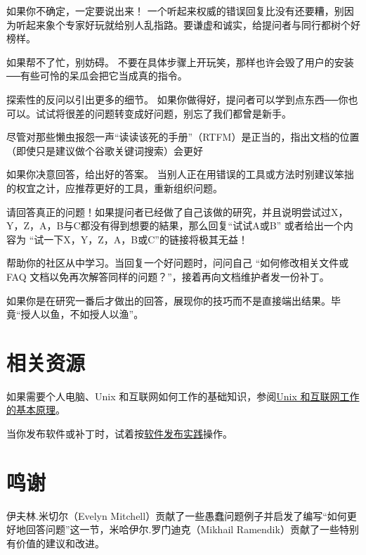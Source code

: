 如果你不确定，一定要说出来！ 一个听起来权威的错误回复比没有还要糟，别因为听起来象个专家好玩就给别人乱指路。要谦虚和诚实，给提问者与同行都树个好榜样。

如果帮不了忙，别妨碍。 不要在具体步骤上开玩笑，那样也许会毁了用户的安装──有些可怜的呆瓜会把它当成真的指令。

探索性的反问以引出更多的细节。 如果你做得好，提问者可以学到点东西──你也可以。试试将很差的问题转变成好问题，别忘了我们都曾是新手。

尽管对那些懒虫报怨一声“读读该死的手册”（RTFM）是正当的，指出文档的位置（即使只是建议做个谷歌关键词搜索）会更好

如果你决意回答，给出好的答案。 当别人正在用错误的工具或方法时别建议笨拙的权宜之计，应推荐更好的工具，重新组织问题。

请回答真正的问题！如果提问者已经做了自己该做的研究，并且说明尝试过X，Y，Z，A，B与C都没有得到想要的結果，那么回复“试试A或B” 或者给出一个内容为 “试一下X，Y，Z，A，B或C”的链接将极其无益！

帮助你的社区从中学习。当回复一个好问题时，问问自己 “如何修改相关文件或 FAQ 文档以免再次解答同样的问题？”，接着再向文档维护者发一份补丁。

如果你是在研究一番后才做出的回答，展现你的技巧而不是直接端出结果。毕竟“授人以鱼，不如授人以渔”。






\section{相关资源}

如果需要个人电脑、Unix 和互联网如何工作的基础知识，参阅\href{http://en.tldp.org/HOWTO/Unix-and-Internet-Fundamentals-HOWTO/}{Unix 和互联网工作的基本原理}。

当你发布软件或补丁时，试着按\href{http://en.tldp.org/HOWTO/Software-Release-Practice-HOWTO/index.html}{软件发布实践}操作。




\section{鸣谢}


伊夫林.米切尔（Evelyn Mitchell）贡献了一些愚蠢问题例子并启发了编写“如何更好地回答问题”这一节，米哈伊尔.罗门迪克（Mikhail Ramendik）贡献了一些特别有价值的建议和改进。











\clearpage